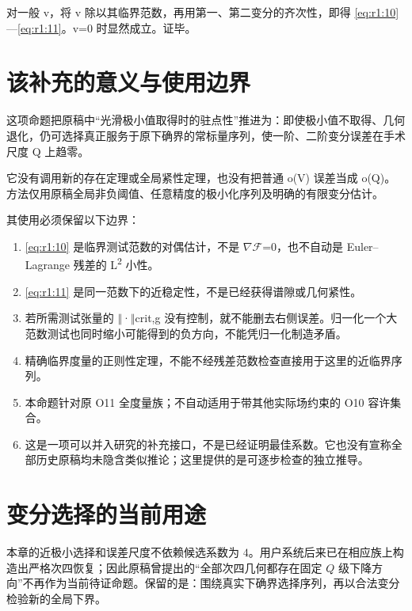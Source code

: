 \documentclass[UTF8,11pt,openany,oneside,fontset=none]{ctexbook}
\providecommand{\tightlist}{\setlength{\itemsep}{1pt}\setlength{\parskip}{0pt}}
\begin{document}
对一般 v，将 v 除以其临界范数，再用第一、第二变分的齐次性，即得 \eqref{eq:r1:10}---\eqref{eq:r1:11}。v=0 时显然成立。证毕。

\section{该补充的意义与使用边界}\label{ch1:ux8be5ux8865ux5145ux7684ux610fux4e49ux4e0eux4f7fux7528ux8fb9ux754c}

这项命题把原稿中``光滑极小值取得时的驻点性''推进为：即使极小值不取得、几何退化，仍可选择真正服务于原下确界的常标量序列，使一阶、二阶变分误差在手术尺度 Q 上趋零。

它没有调用新的存在定理或全局紧性定理，也没有把普通 o(V) 误差当成 o(Q)。方法仅用原稿全局非负阈值、任意精度的极小化序列及明确的有限变分估计。

其使用必须保留以下边界：

\begin{enumerate}
\def\labelenumi{\arabic{enumi}.}
\tightlist
\item
  \eqref{eq:r1:10} 是临界测试范数的对偶估计，不是 \(\nabla\)\(\mathscr F\)=0，也不自动是 Euler--Lagrange 残差的 L\textsuperscript{2} 小性。
\item
  \eqref{eq:r1:11} 是同一范数下的近稳定性，不是已经获得谱隙或几何紧性。
\item
  若所需测试张量的 \(\Vert\)·\(\Vert\)crit,g 没有控制，就不能删去右侧误差。归一化一个大范数测试也同时缩小可能得到的负方向，不能凭归一化制造矛盾。
\item
  精确临界度量的正则性定理，不能不经残差范数检查直接用于这里的近临界序列。
\item
  本命题针对原 O11 全度量族；不自动适用于带其他实际场约束的 O10 容许集合。
\item
  这是一项可以并入研究的补充接口，不是已经证明最佳系数。它也没有宣称全部历史原稿均未隐含类似推论；这里提供的是可逐步检查的独立推导。
\end{enumerate}

\section{变分选择的当前用途}\label{ch1:ux53d8ux5206ux9009ux62e9ux7684ux5f53ux524dux7528ux9014}

本章的近极小选择和误差尺度不依赖候选系数为 \(4\)。用户系统后来已在相应族上构造出严格次四恢复；因此原稿曾提出的``全部次四几何都存在固定 \(Q\) 级下降方向''不再作为当前待证命题。保留的是：围绕真实下确界选择序列，再以合法变分检验新的全局下界。\cite{System}
\end{document}
